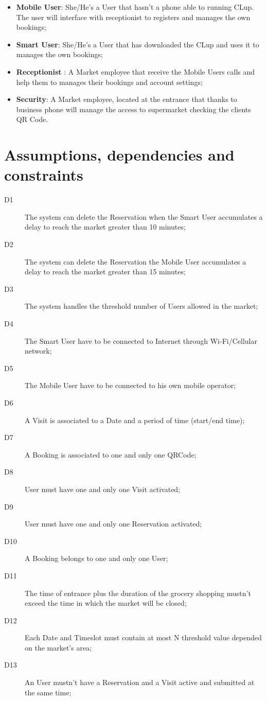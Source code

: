 \begin{itemize}
\item\textbf{Mobile User}: She/He's a User that hasn't a phone able to running CLup. The user will interface with receptionist to registers and manages the own bookings;
\item\textbf{Smart User}: She/He's a User that has downloaded the CLup and uses it to manages the own bookings;
\item\textbf{Receptionist} : A Market employee that receive the Mobile Users calls and help them to manages their bookings and account settings;
\item\textbf{Security}: A Market employee, located at the entrance that thanks to business phone will manage the access to supermarket checking the clients QR Code.
\end{itemize}
\pagebreak
\section{Assumptions, dependencies and constraints}
\begin{description}
    \item[D1] The system can delete the Reservation when the Smart User accumulates a delay to reach the market greater than 10 minutes; 
    \item[D2] The system can delete the Reservation the Mobile User accumulates a delay to reach the market greater than 15 minutes; 
    \item[D3] The system handles the threshold number of Users allowed in the market;
    \item[D4] The Smart User have to be connected to Internet through Wi-Fi/Cellular network;
    \item[D5] The Mobile User have to be connected to his own mobile operator;
    \item[D6] A Visit is associated to a Date and a period of time (start/end time);
    \item[D7] A Booking is associated to one and only one QRCode;
    \item[D8] User must have one and only one Visit activated;
    \item[D9] User must have one and only one Reservation activated;
    \item[D10] A Booking belongs to one and only one User;
    \item[D11] The time  of entrance plus the duration of the grocery shopping mustn’t exceed the time in which the market will be closed; 
    \item[D12] Each Date and Timeslot must contain at most N threshold value depended on the market's area;
    \item[D13] An User mustn’t have a Reservation and a Visit active and submitted at the same time;
\end{description}

